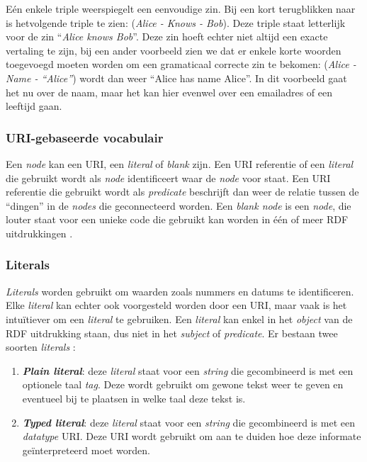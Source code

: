 Eén enkele triple weerspiegelt een eenvoudige zin. Bij een kort terugblikken naar  is hetvolgende triple te zien: (\textit{Alice - Knows - Bob}). Deze triple staat letterlijk voor de zin ``\textit{Alice knows Bob}''. Deze zin hoeft echter niet altijd een exacte vertaling te zijn, bij een ander voorbeeld zien we dat er enkele korte woorden toegevoegd moeten worden om een gramaticaal correcte zin te bekomen: (\textit{Alice - Name - ``Alice''}) wordt dan weer ``Alice has name Alice''. In dit voorbeeld gaat het nu over de naam, maar het kan hier evenwel over een emailadres of een leeftijd gaan.

\subsubsection{URI-gebaseerde vocabulair}
Een \textit{node} kan een URI, een \textit{literal} of \textit{blank} zijn. Een URI referentie of een \textit{literal} die gebruikt wordt als \textit{node} identificeert waar de \textit{node} voor staat. Een URI referentie die gebruikt wordt als \textit{predicate} beschrijft dan weer de relatie tussen de ``dingen'' in de \textit{nodes} die geconnecteerd worden. Een \textit{blank node} is een \textit{node}, die louter staat voor een unieke code die gebruikt kan worden in één of meer RDF uitdrukkingen \cite{klyne2009resource}.

\subsubsection{Literals}
\textit{Literals} worden gebruikt om waarden zoals nummers en datums te identificeren. Elke \textit{literal} kan echter ook voorgesteld worden door een URI, maar vaak is het intuïtiever om een \textit{literal} te gebruiken. Een \textit{literal} kan enkel in het \textit{object} van de RDF uitdrukking staan, dus niet in het \textit{subject} of \textit{predicate}. Er bestaan twee soorten \textit{literals} \cite{klyne2009resource}:
\begin{enumerate}
    \item \textbf{\textit{Plain literal}}: deze \textit{literal} staat voor een \textit{string} die gecombineerd is met een optionele taal \textit{tag}. Deze wordt gebruikt om gewone tekst weer te geven en eventueel bij te plaatsen in welke taal deze tekst is.
    \item \textbf{\textit{Typed literal}}: deze \textit{literal} staat voor een \textit{string} die gecombineerd is met een \textit{datatype} URI. Deze URI wordt gebruikt om aan te duiden hoe deze informate geïnterpreteerd moet worden.
\end{enumerate}

